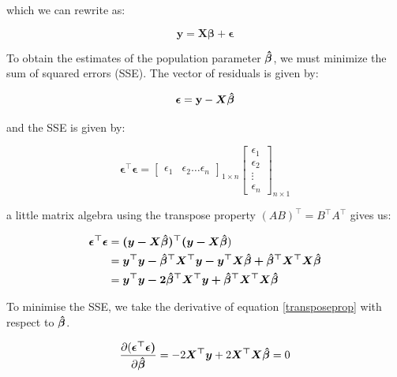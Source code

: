 \documentclass{article}
\begin{document}
\noindent which we can rewrite as:

\begin{equation}
    \mathbf{y} = \mathbf{X}\bm{\beta} + \bm{\epsilon}
\end{equation}

\noindent To obtain the estimates of the population parameter $\bm{\Hat{\beta}}$, we must minimize the sum of squared errors (SSE). The vector of residuals is given by:

\begin{equation}\label{eqn:olsepsilonerror}
    \bm{\epsilon} =  \mathbf{y} - \bm{X}\bm{\Hat{\beta}}
\end{equation}

\noindent and the SSE is given by:

\begin{equation}
    \bm{\epsilon^\top \epsilon} = \begin{bmatrix}
    \epsilon_1 & \epsilon_2 \dots \epsilon_n
    \end{bmatrix}_{1 \times n}
    \begin{bmatrix}
        \epsilon_1 \\
        \epsilon_2 \\
        \vdots \\
        \epsilon_n
    \end{bmatrix}_{n \times 1}
\end{equation}

\noindent a little matrix algebra using the transpose property $(AB)^\top = B^\top A^\top$ gives us: 

\begin{align}\label{eqn:olstransposeprop}
    \nonumber \bm{\epsilon^\top \epsilon} &= \bm{({y} - {X}\Hat{\beta})^\top (y - X \Hat{\beta}}) \\ \nonumber
    &= \bm{y^\top y - \Hat{\beta}^\top X^\top y - y^\top X \Hat{\beta} + \Hat{\beta}^\top X^\top X \Hat{\beta}} \\ 
    &= \bm{y^\top y - 2\Hat{\beta}^\top X^\top y + \Hat{\beta}^\top X^\top X \Hat{\beta}}
\end{align}

\noindent To minimise the SSE, we take the derivative of equation \ref{transposeprop} with respect to $\bm{\Hat{\beta}}$.

\begin{equation}\label{eqn:olsderivativessr}
    \frac{\partial (\bm{\epsilon^\top \epsilon)}}{\partial \bm{\Hat{\beta}}} = -2 \bm{X^\top y} + 2\bm{X^\top X \Hat{\beta}} = 0
\end{equation}
\end{document}

